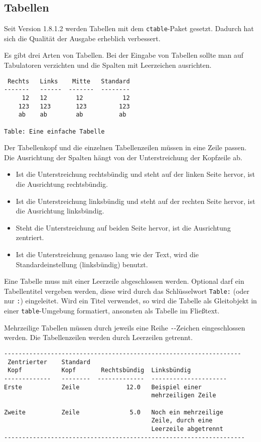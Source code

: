 \documentclass[11pt,ngerman,a4paper]{article}
\begin{document}
\subsection{Tabellen}

Seit Version 1.8.1.2 werden Tabellen mit dem \texttt{ctable}-Paket
gesetzt. Dadurch hat sich die Qualität der Ausgabe erheblich verbessert.

Es gibt drei Arten von Tabellen. Bei der Eingabe von Tabellen sollte man
auf Tabulatoren verzichten und die Spalten mit Leerzeichen ausrichten.

\begin{verbatim}
 Rechts   Links    Mitte   Standard
-------   ------  -------  --------
     12   12        12           12
    123   123       123         123
    ab    ab        ab          ab

Table: Eine einfache Tabelle
\end{verbatim}

Der Tabellenkopf und die einzelnen Tabellenzeilen müssen in eine Zeile
passen. Die Ausrichtung der Spalten hängt von der Unterstreichung der
Kopfzeile ab.

\begin{itemize}
\item
  Ist die Unterstreichung rechtsbündig und steht auf der linken Seite
  hervor, ist die Ausrichtung rechtsbündig.
\item
  Ist die Unterstreichung linksbündig und steht auf der rechten Seite
  hervor, ist die Ausrichtung linksbündig.
\item
  Steht die Unterstreichung auf beiden Seite hervor, ist die Ausrichtung
  zentriert.
\item
  Ist die Unterstreichung genauso lang wie der Text, wird die
  Standardeinstellung (linksbündig) benutzt.
\end{itemize}

Eine Tabelle muss mit einer Leerzeile abgeschlossen werden. Optional
darf ein Tabellentitel vergeben werden, diese wird durch das
Schlüsselwort \texttt{Table:} (oder nur \texttt{:}) eingeleitet. Wird
ein Titel verwendet, so wird die Tabelle als Gleitobjekt in einer
\texttt{table}-Umgebung formatiert, ansonsten als Tabelle im Fließtext.

Mehrzeilige Tabellen müssen durch jeweils eine Reihe \texttt{-}-Zeichen
eingeschlossen werden. Die Tabellenzeilen werden durch Leerzeilen
getrennt.

\begin{verbatim}
------------------------------------------------------------------
 Zentrierter    Standard    
 Kopf           Kopf       Rechtsbündig  Linksbündig
-------------   --------  -------------  ---------------------
Erste           Zeile             12.0   Beispiel einer 
                                         mehrzeiligen Zeile

Zweite          Zeile              5.0   Noch ein mehrzeilige
                                         Zeile, durch eine
                                         Leerzeile abgetrennt
-------------------------------------------------------------------
\end{verbatim}
\end{document}
